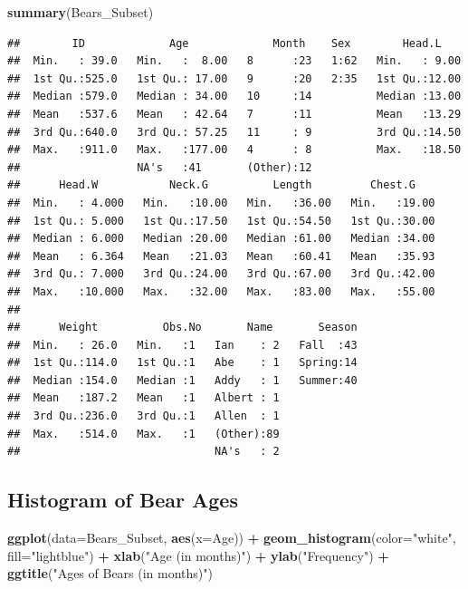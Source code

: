 \documentclass[]{book}
\newenvironment{Shaded}{\begin{snugshade}}{\end{snugshade}}
\newcommand{\KeywordTok}[1]{\textcolor[rgb]{0.13,0.29,0.53}{\textbf{#1}}}
\newcommand{\DataTypeTok}[1]{\textcolor[rgb]{0.13,0.29,0.53}{#1}}
\newcommand{\StringTok}[1]{\textcolor[rgb]{0.31,0.60,0.02}{#1}}
\newcommand{\OperatorTok}[1]{\textcolor[rgb]{0.81,0.36,0.00}{\textbf{#1}}}
\newcommand{\NormalTok}[1]{#1}
\begin{document}
\begin{Shaded}
\begin{Highlighting}[]
\KeywordTok{summary}\NormalTok{(Bears_Subset)}
\end{Highlighting}
\end{Shaded}

\begin{verbatim}
##        ID             Age             Month    Sex        Head.L     
##  Min.   : 39.0   Min.   :  8.00   8      :23   1:62   Min.   : 9.00  
##  1st Qu.:525.0   1st Qu.: 17.00   9      :20   2:35   1st Qu.:12.00  
##  Median :579.0   Median : 34.00   10     :14          Median :13.00  
##  Mean   :537.6   Mean   : 42.64   7      :11          Mean   :13.29  
##  3rd Qu.:640.0   3rd Qu.: 57.25   11     : 9          3rd Qu.:14.50  
##  Max.   :911.0   Max.   :177.00   4      : 8          Max.   :18.50  
##                  NA's   :41       (Other):12                         
##      Head.W           Neck.G          Length         Chest.G     
##  Min.   : 4.000   Min.   :10.00   Min.   :36.00   Min.   :19.00  
##  1st Qu.: 5.000   1st Qu.:17.50   1st Qu.:54.50   1st Qu.:30.00  
##  Median : 6.000   Median :20.00   Median :61.00   Median :34.00  
##  Mean   : 6.364   Mean   :21.03   Mean   :60.41   Mean   :35.93  
##  3rd Qu.: 7.000   3rd Qu.:24.00   3rd Qu.:67.00   3rd Qu.:42.00  
##  Max.   :10.000   Max.   :32.00   Max.   :83.00   Max.   :55.00  
##                                                                  
##      Weight          Obs.No       Name       Season  
##  Min.   : 26.0   Min.   :1   Ian    : 2   Fall  :43  
##  1st Qu.:114.0   1st Qu.:1   Abe    : 1   Spring:14  
##  Median :154.0   Median :1   Addy   : 1   Summer:40  
##  Mean   :187.2   Mean   :1   Albert : 1              
##  3rd Qu.:236.0   3rd Qu.:1   Allen  : 1              
##  Max.   :514.0   Max.   :1   (Other):89              
##                              NA's   : 2
\end{verbatim}

\subsection{Histogram of Bear Ages}\label{histogram-of-bear-ages}

\begin{Shaded}
\begin{Highlighting}[]
\KeywordTok{ggplot}\NormalTok{(}\DataTypeTok{data=}\NormalTok{Bears_Subset, }\KeywordTok{aes}\NormalTok{(}\DataTypeTok{x=}\NormalTok{Age)) }\OperatorTok{+}\StringTok{ }
\StringTok{  }\KeywordTok{geom_histogram}\NormalTok{(}\DataTypeTok{color=}\StringTok{"white"}\NormalTok{, }\DataTypeTok{fill=}\StringTok{"lightblue"}\NormalTok{) }\OperatorTok{+}\StringTok{ }
\StringTok{  }\KeywordTok{xlab}\NormalTok{(}\StringTok{"Age (in months)"}\NormalTok{) }\OperatorTok{+}\StringTok{ }\KeywordTok{ylab}\NormalTok{(}\StringTok{"Frequency"}\NormalTok{) }\OperatorTok{+}\StringTok{ }\KeywordTok{ggtitle}\NormalTok{(}\StringTok{"Ages of Bears (in months)"}\NormalTok{)}
\end{Highlighting}
\end{Shaded}
\end{document}
